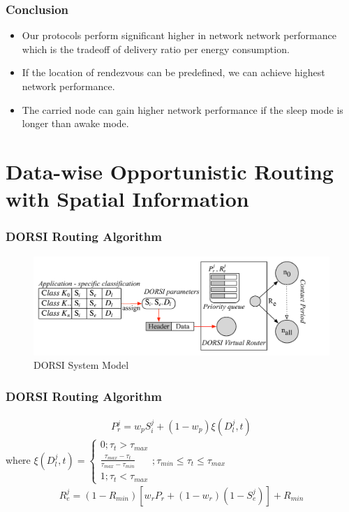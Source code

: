 \documentclass{beamer}
\begin{document}
\begin{frame}
	\frametitle{Conclusion}
\begin{itemize}
	\item Our protocols perform significant higher in network network performance which is the tradeoff of delivery ratio per energy consumption. 
	\item If the location of rendezvous can be predefined, we can achieve highest network performance. 
	\item The carried node can gain higher network performance if the sleep mode is longer than awake mode.
\end{itemize}
\end{frame}


\section{Data-wise Opportunistic Routing with Spatial Information}
\begin{frame}
	\frametitle{DORSI Routing Algorithm}
	\begin{figure}
\centering
\includegraphics[width=0.7\linewidth]{Figures_Present/Fig2}
\caption{DORSI System Model}
\label{fig:Fig2}
\end{figure}
\end{frame}
\begin{frame}
	\frametitle{DORSI Routing Algorithm}
\begin{eqnarray}
{ P }_{ r }^{ j }={ w }_{ p }{ S }_{ i }^{ j }+(1-{ w }_{ p })\xi ({ D }_{ l }^{ j },t)
\end{eqnarray}
where
$ \xi ({ D }_{ l }^{ j },t)=\begin{cases} 0;{ \tau  }_{ t }>{ \tau  }_{ max } \\ \frac { { \tau  }_{ max }-{ \tau  }_{ t } }{ { \tau  }_{ max }-{ \tau  }_{ min } }  \\ 1;{ \tau  }_{ t }<{ \tau  }_{ max } \end{cases};{ \tau  }_{ min }\le { \tau  }_{ t }\le { \tau  }_{ max } $
\begin{eqnarray}
{ R }_{ e }^{ j }=(1-{ R }_{ min })[{ w }_{ r }{ P }_{ r }+(1-{ w }_{ r })(1-{ S }_{ e }^{ j })]+{ R }_{ min }
\end{eqnarray}
\end{frame}
\end{document}
